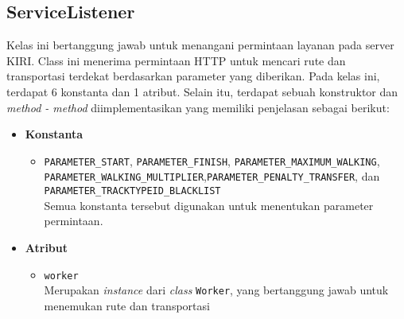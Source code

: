 \subsection{ServiceListener}
Kelas ini bertanggung jawab untuk menangani permintaan layanan pada server KIRI. Class ini menerima permintaan HTTP untuk mencari rute dan transportasi terdekat berdasarkan parameter yang diberikan. Pada kelas ini, terdapat 6 konstanta dan 1 atribut. Selain itu, terdapat sebuah konstruktor dan \textit{method - method} diimplementasikan yang memiliki penjelasan sebagai berikut:
\begin{itemize}
    \item \textbf{Konstanta}
    \begin{itemize}
        \item \texttt{PARAMETER\_START}, \texttt{PARAMETER\_FINISH}, \texttt{PARAMETER\_MAXIMUM\_WALKING}, \\ \texttt{PARAMETER\_WALKING\_MULTIPLIER},\texttt{PARAMETER\_PENALTY\_TRANSFER}, dan \\ \texttt{PARAMETER\_TRACKTYPEID\_BLACKLIST}
        \\ Semua konstanta tersebut digunakan untuk menentukan parameter permintaan.
    \end{itemize}

    \item \textbf{Atribut}
    \begin{itemize}
        \item \texttt{worker}
        \\ Merupakan \textit{instance} dari \textit{class} \texttt{Worker}, yang bertanggung jawab untuk menemukan rute dan transportasi 
    \end{itemize}


\end{itemize}
